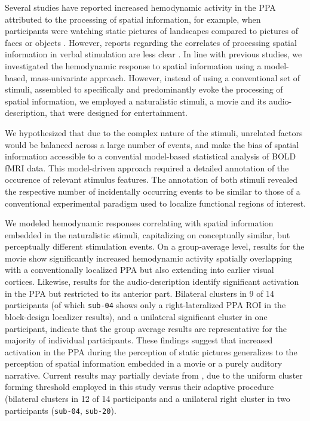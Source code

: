 \documentclass[english]{article}
\begin{document}
Several studies have reported increased hemodynamic activity in the PPA
attributed to the processing of spatial information, for example, when
participants were watching static pictures of landscapes compared to pictures of
faces or objects \citep[e.g.,][]{epstein1998ppa, epstein1999parahippocampal}.
However, reports regarding the correlates of processing spatial information in
verbal stimulation are less clear \citep{aziz2008modulation}.
In line with previous studies, we investigated the hemodynamic response to
spatial information using a model-based, mass-univariate approach.
However, instead of using a conventional set of stimuli, assembled to
specifically and predominantly evoke the processing of spatial information, we
employed a naturalistic stimuli, a movie and its audio-description, that were
designed for entertainment.

We hypothesized that due to the complex nature of the stimuli, unrelated factors
would be balanced across a large number of events, and make the bias of spatial
information accessible to a convential model-based statistical analysis of BOLD
fMRI data.
This model-driven approach required a detailed annotation of the occurence of
relevant stimulus features.
The annotation of both stimuli revealed the respective number of incidentally
occurring events to be similar to those of a conventional experimental paradigm
used to localize functional regions of interest.

We modeled hemodynamic responses correlating with spatial information embedded
in the naturalistic stimuli, capitalizing on conceptually similar, but
perceptually different stimulation events.
On a group-average level, results for the movie show significantly
increased hemodynamic activity spatially overlapping with a conventionally
localized PPA but also extending into earlier visual cortices.
Likewise, results for the audio-description identify significant activation in
the PPA but restricted to its anterior part.
Bilateral clusters in 9 of 14
participants (of which \texttt{sub-04} shows only a right-lateralized PPA ROI
in the block-design localizer results), and a unilateral
significant cluster in one participant, indicate that the group average results
are representative for the majority of individual participants.
These findings suggest that increased activation in the PPA during the
perception of static pictures generalizes to the perception of spatial
information embedded in a movie or a purely auditory narrative.
%
Current results may partially deviate from \cite{sengupta2016extension}, due to
the uniform cluster forming threshold employed in this study versus their
adaptive procedure (bilateral clusters in 12 of 14 participants and a unilateral
right cluster in two participants (\texttt{sub-04}, \texttt{sub-20}).
\end{document}
